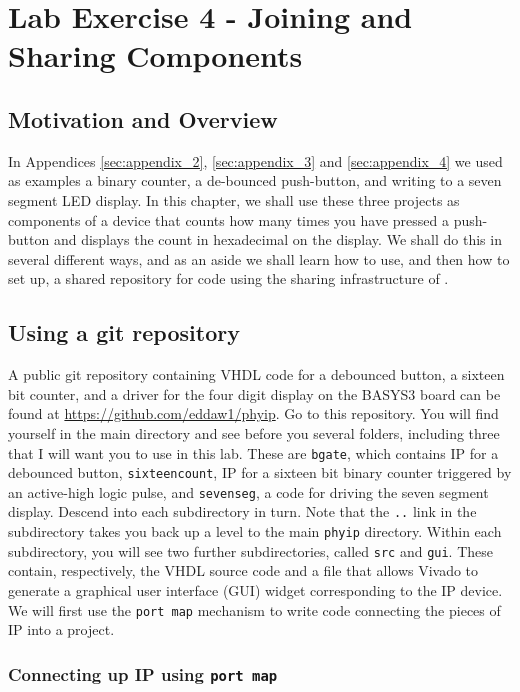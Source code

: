 \documentclass[../physical_computing.tex]{subfiles}
\begin{document}
\chapter{Lab Exercise 4 - Joining and Sharing Components}
\label{sec:appendix_5}

\section{Motivation and Overview}
\label{sec:motivation}

In Appendices \ref{sec:appendix_2}, \ref{sec:appendix_3} and \ref{sec:appendix_4} we used as examples a binary counter, a de-bounced push-button, and writing to a seven segment LED display. In this chapter, we shall use these three projects as components of a device that counts how many times you have pressed a push-button and displays the count in hexadecimal on the display. We shall do this in several different ways, and as an aside we shall learn how to use, and then how to set up, a shared repository for code using the sharing infrastructure of \git.

\section{Using a git repository}
\label{sec:usegit}

A public git repository containing VHDL code for a debounced button, a sixteen bit counter, and a driver for the four digit display on the BASYS3 board can be found at \url{https://github.com/eddaw1/phyip}. Go to this repository. You will find yourself in the main directory and see before you several folders, including three that I will want you to use in this lab. These are 
\texttt{bgate}, which contains IP for a debounced button, \texttt{sixteencount}, IP for a sixteen bit binary counter triggered by 
an active-high logic pulse, and \texttt{sevenseg}, a code for driving the seven segment display. Descend into each subdirectory in turn. Note that the \texttt{..} link in the subdirectory takes you back up a level to the main \texttt{phyip} directory. Within each subdirectory, you will see two further subdirectories, called \texttt{src} and \texttt{gui}. These contain, respectively, the VHDL source code and a file that allows Vivado to generate a graphical user interface (GUI) widget corresponding to the IP device. We will first use the \texttt{port map} mechanism to write code connecting the pieces of IP into a project. 

\subsection{Connecting up IP using \texttt{port map}}
\label{sec:portmap}
\end{document}
